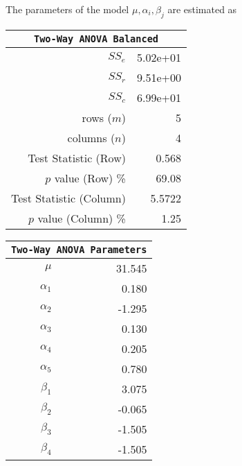 \begin{enumerate}
	The parameters of the model $ \mu, \alpha_i, \beta_j $ are estimated as\\
	
	\begin{table}[H]
		\centering
		\begin{minipage}{0.4\textwidth}
			\centering
			\begin{tabular}{@{}rr@{}}
				\toprule
				\multicolumn{2}{c}{\texttt{Two-Way ANOVA Balanced}} \\
				\midrule
				$SS_e$                  &               5.02e+01 \\
				$SS_r$                  &               9.51e+00 \\
				$SS_c$                  &               6.99e+01 \\
				rows ($m$)              &                      5 \\
				columns ($n$)           &                      4 \\
				Test Statistic (Row)    &                  0.568 \\
				$p$ value (Row) \%      &                  69.08 \\
				Test Statistic (Column) &                 5.5722 \\
				$p$ value (Column) \%   &                   1.25 \\
				\bottomrule
			\end{tabular}
		\end{minipage}
		\begin{minipage}{0.4\textwidth}
			\centering
			\begin{tabular}{@{}rr@{}}
				\toprule
				\multicolumn{2}{c}{\texttt{Two-Way ANOVA Parameters}} \\
				\midrule
				$\mu$      &                   31.545 \\
				$\alpha_1$ &                    0.180 \\
				$\alpha_2$ &                   -1.295 \\
				$\alpha_3$ &                    0.130 \\
				$\alpha_4$ &                    0.205 \\
				$\alpha_5$ &                    0.780 \\
				$\beta_1$  &                    3.075 \\
				$\beta_2$  &                   -0.065 \\
				$\beta_3$  &                   -1.505 \\
				$\beta_4$  &                   -1.505 \\
				\bottomrule
			\end{tabular}
		\end{minipage}
	\end{table}
	\bigskip
	

\end{enumerate}
